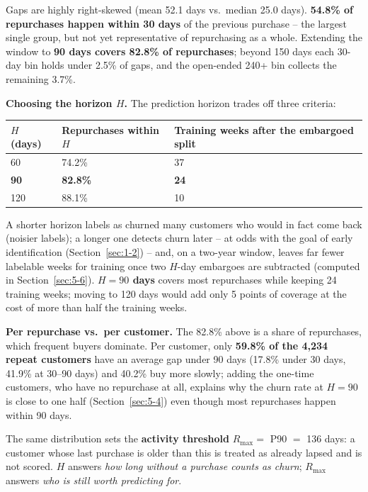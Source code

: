 Gaps are highly right-skewed (mean 52.1 days vs.\ median 25.0 days). \textbf{54.8\% of repurchases happen within 30 days} of the previous purchase -- the largest single group, but not yet representative of repurchasing as a whole. Extending the window to \textbf{90 days covers 82.8\% of repurchases}; beyond 150 days each 30-day bin holds under 2.5\% of gaps, and the open-ended 240+ bin collects the remaining 3.7\%.

\textbf{Choosing the horizon $H$.} The prediction horizon trades off three criteria:

\begin{center}
\begin{tabular}{@{}p{1.6cm}p{5cm}p{4.6cm}@{}}
    \toprule
    $H$ (days) & Repurchases within $H$ & Training weeks after the embargoed split \\
    \midrule
    60 & 74.2\% & 37 \\
    \textbf{90} & \textbf{82.8\%} & \textbf{24} \\
    120 & 88.1\% & 10 \\
    \bottomrule
\end{tabular}
\end{center}

A shorter horizon labels as churned many customers who would in fact come back (noisier labels); a longer one detects churn later -- at odds with the goal of early identification (Section~\ref{sec:1-2}) -- and, on a two-year window, leaves far fewer labelable weeks for training once two $H$-day embargoes are subtracted (computed in Section~\ref{sec:5-6}). \textbf{$H = 90$ days} covers most repurchases while keeping 24 training weeks; moving to 120 days would add only 5 points of coverage at the cost of more than half the training weeks.

\textbf{Per repurchase vs.\ per customer.} The 82.8\% above is a share of repurchases, which frequent buyers dominate. Per customer, only \textbf{59.8\% of the 4,234 repeat customers} have an average gap under 90 days (17.8\% under 30 days, 41.9\% at 30--90 days) and 40.2\% buy more slowly; adding the one-time customers, who have no repurchase at all, explains why the churn rate at $H = 90$ is close to one half (Section~\ref{sec:5-4}) even though most repurchases happen within 90 days.

The same distribution sets the \textbf{activity threshold} $R_{\max} = $ P90 $=$ 136 days: a customer whose last purchase is older than this is treated as already lapsed and is not scored. $H$ answers \emph{how long without a purchase counts as churn}; $R_{\max}$ answers \emph{who is still worth predicting for}.

